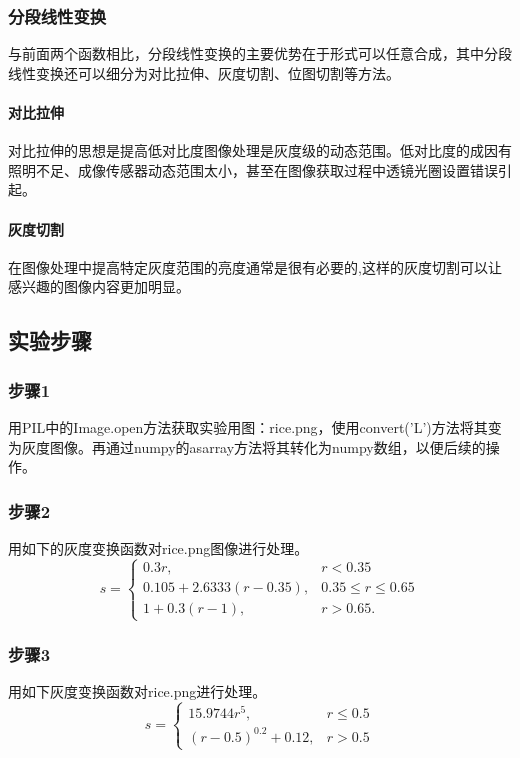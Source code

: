 \documentclass[]{IEEEphot}
\begin{document}
\subsubsection{分段线性变换}
与前面两个函数相比，分段线性变换的主要优势在于形式可以任意合成，其中分段线性变换还可以细分为对比拉伸、灰度切割、位图切割等方法。
\paragraph{对比拉伸}
对比拉伸的思想是提高低对比度图像处理是灰度级的动态范围。低对比度的成因有照明不足、成像传感器动态范围太小，甚至在图像获取过程中透镜光圈设置错误引起。
\paragraph{灰度切割}
在图像处理中提高特定灰度范围的亮度通常是很有必要的,这样的灰度切割可以让感兴趣的图像内容更加明显。
\subsection{实验步骤}
\subsubsection{步骤1}
用PIL中的Image.open方法获取实验用图：rice.png，使用convert('L')方法将其变为灰度图像。再通过numpy的asarray方法将其转化为numpy数组，以便后续的操作。
\subsubsection{步骤2}
用如下的灰度变换函数对rice.png图像进行处理。
\begin{equation}
	s = \left\{
		\begin{array}{lr}
			0.3r, & r < 0.35 \\
			0.105 + 2.6333(r-0.35), & 0.35\leq r \leq 0.65\\
					  1 + 0.3(r-1), & r > 0.65.
		\end{array}
		\right.
		\label{eql}
\end{equation}
\subsubsection{步骤3}
用如下灰度变换函数对rice.png进行处理。
\begin{equation}
	s = \left\{
		\begin{array}{lr}
			15.9744r^5, & r \leq 0.5 \\
	(r-0.5)^{0.2}+0.12, & r > 0.5 
		\end{array}\right.
		\label{eql}
	\end{equation}
\end{document}
